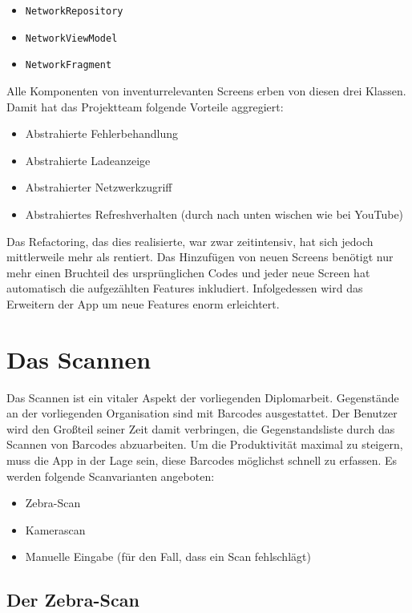 \begin{itemize}
\tightlist
\item
  \texttt{NetworkRepository}
\item
  \texttt{NetworkViewModel}
\item
  \texttt{NetworkFragment}
\end{itemize}

Alle Komponenten von inventurrelevanten Screens erben von diesen drei
Klassen. Damit hat das Projektteam folgende Vorteile aggregiert:

\begin{itemize}
\tightlist
\item
  Abstrahierte Fehlerbehandlung
\item
  Abstrahierte Ladeanzeige
\item
  Abstrahierter Netzwerkzugriff
\item
  Abstrahiertes Refreshverhalten (durch nach unten wischen wie \zB bei
  YouTube)
\end{itemize}

Das Refactoring, das dies realisierte, war zwar zeitintensiv, hat sich
jedoch mittlerweile mehr als rentiert. Das Hinzufügen von neuen Screens
benötigt nur mehr einen Bruchteil des ursprünglichen Codes und jeder
neue Screen hat automatisch die aufgezählten Features inkludiert.
Infolgedessen wird das Erweitern der App um neue Features enorm
erleichtert.

\chapter{Das Scannen}
\label{das_scannen}

Das Scannen ist ein vitaler Aspekt der vorliegenden Diplomarbeit.
Gegenstände an der vorliegenden Organisation sind mit Barcodes
ausgestattet. Der Benutzer wird den Großteil seiner Zeit damit
verbringen, die Gegenstandsliste durch das Scannen von Barcodes
abzuarbeiten. Um die Produktivität maximal zu steigern, muss die App in
der Lage sein, diese Barcodes möglichst schnell zu erfassen. Es werden
folgende Scanvarianten angeboten:

\begin{itemize}
\tightlist
\item
  Zebra-Scan
\item
  Kamerascan
\item
  Manuelle Eingabe (für den Fall, dass ein Scan fehlschlägt)
\end{itemize}

\hypertarget{der-zebra-scan}{%
\section{Der Zebra-Scan}\label{der-zebra-scan}}

